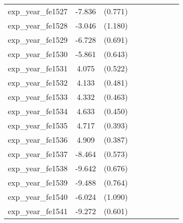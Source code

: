{\begin{tabular}{l*{4}{cc}}
exp\_year\_fe1527&   -7.836\sym{***}&  (0.771)&                  &         &                  &         &                  &         \\
exp\_year\_fe1528&   -3.046\sym{**} &  (1.180)&                  &         &                  &         &                  &         \\
exp\_year\_fe1529&   -6.728\sym{***}&  (0.691)&                  &         &                  &         &                  &         \\
exp\_year\_fe1530&   -5.861\sym{***}&  (0.643)&                  &         &                  &         &                  &         \\
exp\_year\_fe1531&    4.075\sym{***}&  (0.522)&                  &         &                  &         &                  &         \\
exp\_year\_fe1532&    4.133\sym{***}&  (0.481)&                  &         &                  &         &                  &         \\
exp\_year\_fe1533&    4.332\sym{***}&  (0.463)&                  &         &                  &         &                  &         \\
exp\_year\_fe1534&    4.633\sym{***}&  (0.450)&                  &         &                  &         &                  &         \\
exp\_year\_fe1535&    4.717\sym{***}&  (0.393)&                  &         &                  &         &                  &         \\
exp\_year\_fe1536&    4.909\sym{***}&  (0.387)&                  &         &                  &         &                  &         \\
exp\_year\_fe1537&   -8.464\sym{***}&  (0.573)&                  &         &                  &         &                  &         \\
exp\_year\_fe1538&   -9.642\sym{***}&  (0.676)&                  &         &                  &         &                  &         \\
exp\_year\_fe1539&   -9.488\sym{***}&  (0.764)&                  &         &                  &         &                  &         \\
exp\_year\_fe1540&   -6.024\sym{***}&  (1.090)&                  &         &                  &         &                  &         \\
exp\_year\_fe1541&   -9.272\sym{***}&  (0.601)&                  &         &                  &         &                  &         \\

\end{tabular}}
